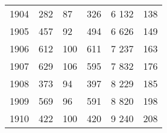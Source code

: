 \documentclass[leqno]{article}  %
\begin{document}
\begin{table}
{\begin{tabular}{p{}|p{}|p{}|p{}|p{}|p{}}
1904 & \hfill 282 \hspace*{2.5mm} & \hfill 87 \hspace*{2.5mm} & \hfill 326 \hspace*{2.5mm} & \hfill 6 132 \hspace*{2.5mm} & \hfill 138 \hspace*{2.5mm} \\
1905 & \hfill 457 \hspace*{2.5mm} & \hfill 92 \hspace*{2.5mm} & \hfill 494 \hspace*{2.5mm} & \hfill 6 626 \hspace*{2.5mm} & \hfill 149 \hspace*{2.5mm} \\
1906 & \hfill 612 \hspace*{2.5mm} & \hfill 100 \hspace*{2.5mm} & \hfill 611 \hspace*{2.5mm} & \hfill 7 237 \hspace*{2.5mm} & \hfill 163 \hspace*{2.5mm} \\
1907 & \hfill 629 \hspace*{2.5mm} & \hfill 106 \hspace*{2.5mm} & \hfill 595 \hspace*{2.5mm} & \hfill 7 832 \hspace*{2.5mm} & \hfill 176 \hspace*{2.5mm} \\
1908 & \hfill 373 \hspace*{2.5mm} & \hfill 94 \hspace*{2.5mm} & \hfill 397 \hspace*{2.5mm} & \hfill 8 229 \hspace*{2.5mm} & \hfill 185 \hspace*{2.5mm} \\
1909 & \hfill 569 \hspace*{2.5mm} & \hfill 96 \hspace*{2.5mm} & \hfill 591 \hspace*{2.5mm} & \hfill 8 820 \hspace*{2.5mm} & \hfill 198 \hspace*{2.5mm} \\
1910 & \hfill 422 \hspace*{2.5mm} & \hfill 100 \hspace*{2.5mm} & \hfill 420 \hspace*{2.5mm} & \hfill 9 240 \hspace*{2.5mm} & \hfill 208 \hspace*{2.5mm} \\

\end{tabular}}
\end{table}
\end{document}
